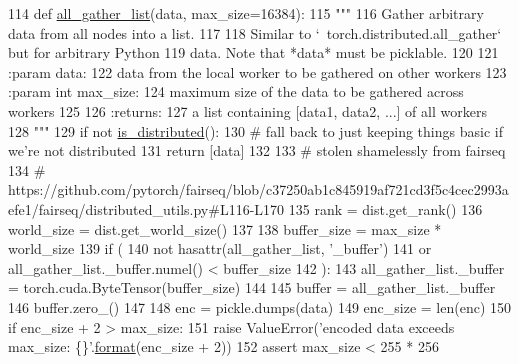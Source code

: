 \begin{DoxyCode}
114 \textcolor{keyword}{def }\hyperlink{namespaceparlai_1_1utils_1_1distributed_a9ef5bf0debf512ddbeb045327bfd87ef}{all\_gather\_list}(data, max\_size=16384):
115     \textcolor{stringliteral}{"""}
116 \textcolor{stringliteral}{    Gather arbitrary data from all nodes into a list.}
117 \textcolor{stringliteral}{}
118 \textcolor{stringliteral}{    Similar to `~torch.distributed.all\_gather` but for arbitrary Python}
119 \textcolor{stringliteral}{    data. Note that *data* must be picklable.}
120 \textcolor{stringliteral}{}
121 \textcolor{stringliteral}{    :param data:}
122 \textcolor{stringliteral}{        data from the local worker to be gathered on other workers}
123 \textcolor{stringliteral}{    :param int max\_size:}
124 \textcolor{stringliteral}{        maximum size of the data to be gathered across workers}
125 \textcolor{stringliteral}{}
126 \textcolor{stringliteral}{    :returns:}
127 \textcolor{stringliteral}{        a list containing [data1, data2, ...] of all workers}
128 \textcolor{stringliteral}{    """}
129     \textcolor{keywordflow}{if} \textcolor{keywordflow}{not} \hyperlink{namespaceparlai_1_1utils_1_1distributed_a023acb5e3b66e1f27e21247c35661279}{is\_distributed}():
130         \textcolor{comment}{# fall back to just keeping things basic if we're not distributed}
131         \textcolor{keywordflow}{return} [data]
132 
133     \textcolor{comment}{# stolen shamelessly from fairseq}
134     \textcolor{comment}{#
       https://github.com/pytorch/fairseq/blob/c37250ab1c845919af721cd3f5c4cec2993aefe1/fairseq/distributed\_utils.py#L116-L170}
135     rank = dist.get\_rank()
136     world\_size = dist.get\_world\_size()
137 
138     buffer\_size = max\_size * world\_size
139     \textcolor{keywordflow}{if} (
140         \textcolor{keywordflow}{not} hasattr(all\_gather\_list, \textcolor{stringliteral}{'\_buffer'})
141         \textcolor{keywordflow}{or} all\_gather\_list.\_buffer.numel() < buffer\_size
142     ):
143         all\_gather\_list.\_buffer = torch.cuda.ByteTensor(buffer\_size)
144 
145     buffer = all\_gather\_list.\_buffer
146     buffer.zero\_()
147 
148     enc = pickle.dumps(data)
149     enc\_size = len(enc)
150     \textcolor{keywordflow}{if} enc\_size + 2 > max\_size:
151         \textcolor{keywordflow}{raise} ValueError(\textcolor{stringliteral}{'encoded data exceeds max\_size: \{\}'}.\hyperlink{namespaceparlai_1_1chat__service_1_1services_1_1messenger_1_1shared__utils_a32e2e2022b824fbaf80c747160b52a76}{format}(enc\_size + 2))
152     \textcolor{keyword}{assert} max\_size < 255 * 256

\end{DoxyCode}
